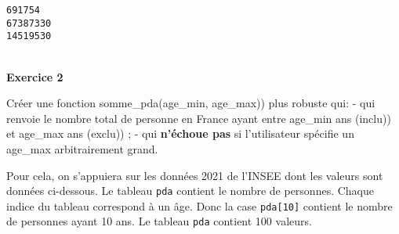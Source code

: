 \documentclass[a4paper,17pt]{extarticle}
\newenvironment{eleve}%
{\begin{activite}\color{noiramu}\\[-0.5cm]}
{\end{activite}}
\begin{document}
    \begin{Verbatim}[commandchars=\\\{\}]
691754
67387330
14519530
    \end{Verbatim}
\begin{eleve}
    \textbf{Exercice 2}

Créer une fonction somme\_pda(age\_min, age\_max)) plus robuste qui: -
qui renvoie le nombre total de personne en France ayant entre age\_min
ans (inclu)) et age\_max ans (exclu)) ; - qui \textbf{n'échoue pas} si
l'utilisateur spécifie un age\_max arbitrairement grand.

Pour cela, on s'appuiera sur les données 2021 de l'INSEE dont les
valeurs sont données ci-dessous. Le tableau \texttt{pda} contient le
nombre de personnes. Chaque indice du tableau correspond à un âge. Donc
la case \texttt{pda{[}10{]}} contient le nombre de personnes ayant 10
ans. Le tableau \texttt{pda} contient 100 valeurs.


\end{eleve}
\end{document}
